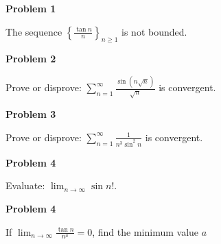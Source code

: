 \documentclass{article}
\begin{document}
\begin{center}
    \textbf{Problem 1}
\end{center}
\begin{problem}{}
    The sequence $\displaystyle \left\{ \frac{\tan n}{n} \right\}_{n \geq 1}$ is not bounded. 
\end{problem}

\vspace{.5cm}
\begin{center}
    \textbf{Problem 2}
\end{center}
\begin{problem}{}
    Prove or disprove: $\displaystyle \sum_{n = 1}^\infty \frac{\sin (n \sqrt{n})}{\sqrt{n}}$ is convergent. 
\end{problem}

\vspace{.5cm}
\begin{center}
    \textbf{Problem 3}
\end{center}
\begin{problem}{}
    Prove or disprove: $\displaystyle \sum_{n = 1}^\infty \frac{1}{n^3 \sin^2 n}$ is convergent. 
\end{problem}

\vspace{.5cm}
\begin{center}
    \textbf{Problem 4}
\end{center}
\begin{problem}{}
    Evaluate: $\displaystyle \lim_{n \to \infty} \sin n!$. 
\end{problem}

\vspace{.5cm}
\begin{center}
    \textbf{Problem 4}
\end{center}
\begin{problem}{}
    If $\displaystyle \lim_{n \to \infty} \frac{\tan n}{n^a} = 0$, find the minimum  value $a$
\end{problem}
\end{document}
